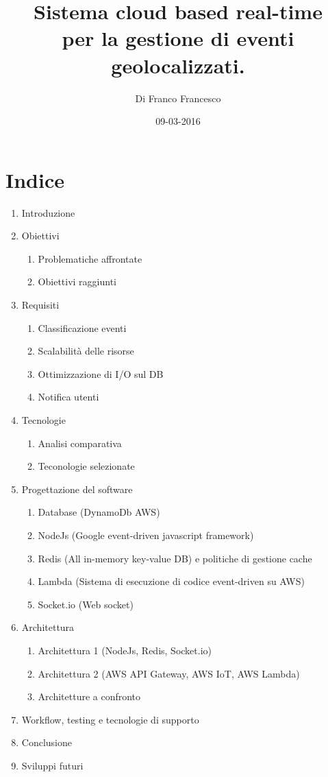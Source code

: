 \documentclass[a4paper,11pt]{report}
\title{Sistema cloud based real-time \\per la gestione di eventi geolocalizzati.}
\author{Di Franco Francesco}
\date{09-03-2016}
\begin{document}






\chapter*{Indice}


\large
\begin{enumerate}[label*=\arabic*.]
\item Introduzione
\item Obiettivi
\begin{enumerate}[label*=\arabic*.]
	\item Problematiche affrontate
	\item Obiettivi raggiunti
\end{enumerate}
\item Requisiti
\begin{enumerate}[label*=\arabic*.]
	\item Classificazione eventi
	\item Scalabilit\`a delle risorse
	\item Ottimizzazione di I/O sul DB
	\item Notifica utenti
\end{enumerate}

\item Tecnologie
\begin{enumerate}[label*=\arabic*.]
	\item Analisi comparativa
	\item Teconologie selezionate
\end{enumerate}
\item Progettazione del software
\begin{enumerate}[label*=\arabic*.]
	\item Database (DynamoDb AWS)
	\item NodeJs (Google event-driven javascript framework)
	\item Redis (All in-memory key-value DB) e politiche di gestione cache
	\item Lambda (Sistema di esecuzione di codice event-driven su AWS)
	\item Socket.io (Web socket)
\end{enumerate}

\item Architettura
\begin{enumerate}[label*=\arabic*.]
	\item Architettura 1 (NodeJs, Redis, Socket.io)
	\item Architettura 2 (AWS API Gateway, AWS IoT, AWS Lambda)
	\item Architetture a confronto
\end{enumerate}

\item Workflow, testing e tecnologie di supporto
\item Conclusione
\item Sviluppi futuri
\end{enumerate}









\end{document}

